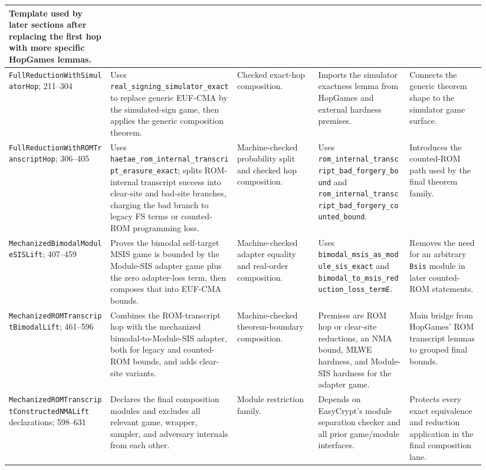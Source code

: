 \documentclass[11pt]{report}
\DeclareRobustCommand{\ec}[1]{\ifmmode\text{\nolinkurl{#1}}\else\nolinkurl{#1}\fi}
\theoremstyle{definition}
\theoremstyle{plain}
\begin{document}
{\begin{longtable}{p{0.20\linewidth}p{0.25\linewidth}p{0.16\linewidth}p{0.18\linewidth}p{0.15\linewidth}}
Template used by later sections after replacing the first hop with more
specific HopGames lemmas. \\
\midrule
\ec{FullReductionWithSimulatorHop}; 211--304 &
Uses \ec{real\_signing\_simulator\_exact} to replace generic EUF-CMA by the
simulated-sign game, then applies the generic composition theorem. &
Checked exact-hop composition. &
Imports the simulator exactness lemma from HopGames and external hardness
premises. &
Connects the generic theorem shape to the simulator game surface. \\
\midrule
\ec{FullReductionWithROMTranscriptHop}; 306--405 &
Uses \ec{haetae\_rom\_internal\_transcript\_erasure\_exact}; splits
ROM-internal transcript success into clear-site and bad-site branches, charging
the bad branch to legacy FS terms or counted-ROM programming loss. &
Machine-checked probability split and checked hop composition. &
Uses \ec{rom\_internal\_transcript\_bad\_forgery\_bound} and
\ec{rom\_internal\_transcript\_bad\_forgery\_counted\_bound}. &
Introduces the counted-ROM path used by the final theorem family. \\
\midrule
\ec{MechanizedBimodalModuleSISLift}; 407--459 &
Proves the bimodal self-target MSIS game is bounded by the Module-SIS adapter
game plus the zero adapter-loss term, then composes that into EUF-CMA bounds. &
Machine-checked adapter equality and real-order composition. &
Uses \ec{bimodal\_msis\_as\_module\_sis\_exact} and
\ec{bimodal\_to\_msis\_reduction\_loss\_termE}. &
Removes the need for an arbitrary \ec{Bsis} module in later counted-ROM
statements. \\
\midrule
\ec{MechanizedROMTranscriptBimodalLift}; 461--596 &
Combines the ROM-transcript hop with the mechanized bimodal-to-Module-SIS
adapter, both for legacy and counted-ROM bounds, and adds clear-site variants. &
Machine-checked theorem-boundary composition. &
Premises are ROM hop or clear-site reductions, an NMA bound, MLWE hardness, and
Module-SIS hardness for the adapter game. &
Main bridge from HopGames' ROM transcript lemmas to grouped final bounds. \\
\midrule
\ec{MechanizedROMTranscriptConstructedNMALift} declarations; 598--631 &
Declares the final composition modules and excludes all relevant game,
wrapper, sampler, and adversary internals from each other. &
Module restriction family. &
Depends on EasyCrypt's module separation checker and all prior game/module
interfaces. &
Protects every exact equivalence and reduction application in the final
composition lane. \\

\end{longtable}}
\end{document}
